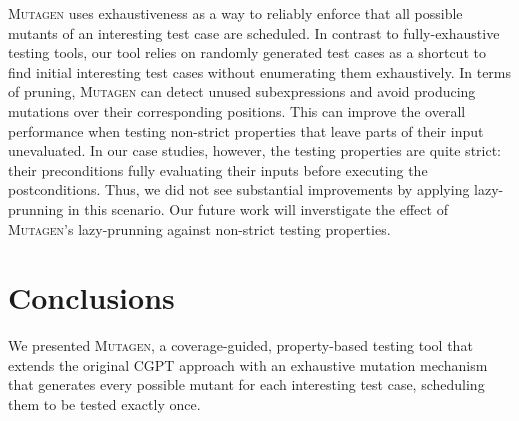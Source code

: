 \documentclass[sigconf,review,anonymous]{acmart}
\newcommand{\mutagen}{\textsc{Mutagen}\xspace}
\begin{document}
\mutagen uses exhaustiveness as a way to reliably enforce that all possible
mutants of an interesting test case are scheduled.
%
In contrast to fully-exhaustive testing tools, our tool relies on randomly
generated test cases as a shortcut to find initial interesting test cases
without enumerating them exhaustively.
%
In terms of pruning, \mutagen can detect unused subexpressions and avoid
producing mutations over their corresponding positions.
%
This can improve the overall performance when testing non-strict properties that
leave parts of their input unevaluated.
%
In our case studies, however, the testing properties are quite strict:
%
their preconditions fully evaluating their inputs before executing the
postconditions.
%
Thus, we did not see substantial improvements by applying lazy-prunning in this
scenario. 
%
Our future work will inverstigate the effect of \mutagen's lazy-prunning against
non-strict testing properties. 



\section{Conclusions}
\label{sec:conclusions}

We presented \mutagen, a coverage-guided, property-based testing tool that
%
%
extends the original CGPT approach
with an exhaustive mutation mechanism that generates every possible mutant for
each interesting test case, scheduling them to be tested exactly once.


\end{document}
